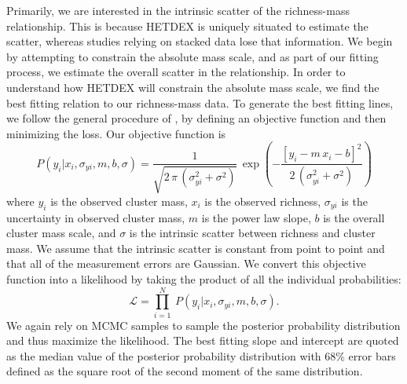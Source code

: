 Primarily, we are interested in the intrinsic scatter of the richness-mass relationship. This is because HETDEX is uniquely situated to estimate the scatter, whereas studies relying on stacked data  lose that information. We begin by attempting to constrain the absolute mass scale, and as part of our fitting process, we estimate the overall scatter in the relationship. In order to understand how HETDEX will constrain the absolute mass scale, we find the best fitting relation to our richness-mass data. To generate the best fitting lines, we follow the general procedure of \cite{Hogg2010}, by defining an objective function and then minimizing the loss. Our objective function is
\begin{equation}\label{eq:objectivei}
P(y_i|x_i,\sigma_{yi},m,b,\sigma) = \frac{1}{\sqrt{2\,\pi\,(\sigma_{yi}^2+\sigma^2)}}
 \,\exp\left(-\frac{[y_i - m\,x_i - b]^2}{2\,(\sigma_{yi}^2+\sigma^2)}\right)
\end{equation}
where $y_i$ is the observed cluster mass, $x_i$ is the observed richness, $\sigma_{yi}$ is the uncertainty in observed cluster mass, $m$ is the power law slope, $b$ is the overall cluster mass scale, and $\sigma$ is the intrinsic scatter between richness and cluster mass. We assume that the intrinsic scatter is constant from point to point and that all of the measurement errors are Gaussian. We convert this objective function into a likelihood by taking the product of all the individual probabilities:  
\begin{equation}\label{eq:like}
\mathscr{L} = \prod_{i=1}^N \ P(y_i|x_i,\sigma_{yi},m,b, \sigma).
\end{equation}
We again rely on MCMC samples to sample the posterior probability distribution and thus maximize the likelihood. The best fitting slope and intercept are quoted as the median value of the posterior probability distribution with 68\% error bars defined as the square root of the second moment of the same distribution.

